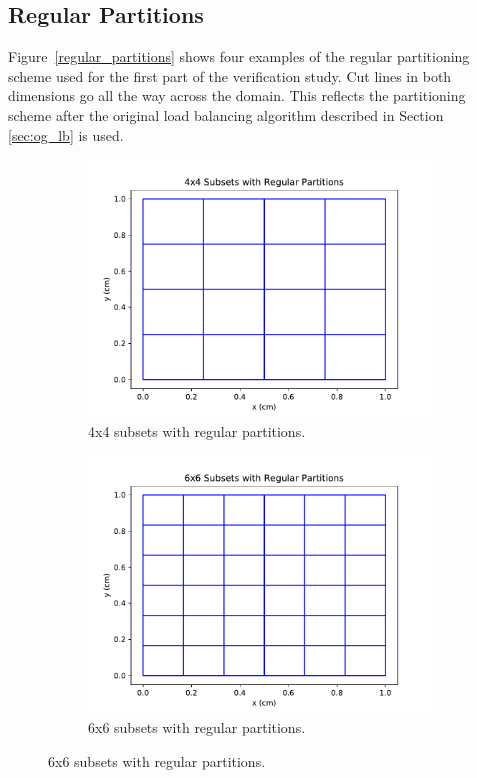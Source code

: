 \subsection{Regular Partitions}

Figure~\ref{regular_partitions} shows four examples of the regular partitioning scheme used for the first part of the verification study. Cut lines in both dimensions go all the way across the domain. This reflects the partitioning scheme after the original load balancing algorithm described in Section \ref{sec:og_lb} is used.

\begin{figure}[H]
\centering
\begin{subfigure}[b]{0.45\textwidth}
  \includegraphics[width=\textwidth]{../cut_line_files/4_regular.pdf}
  \caption{4x4 subsets with regular partitions.}
  \label{4regular}
\end{subfigure}
\begin{subfigure}[b]{0.45\textwidth}
  \includegraphics[width=\textwidth]{../cut_line_files/6_regular.pdf}
  \caption{6x6 subsets with regular partitions.}
  \label{6regular}
\end{subfigure}


\end{figure}
